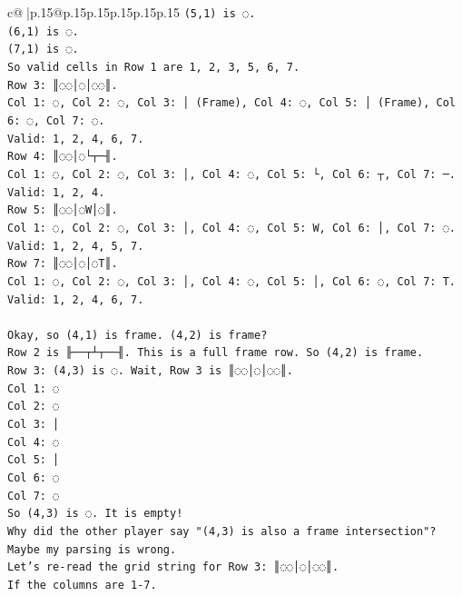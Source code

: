 \documentclass{article}
\begin{document}
{\begin{supertabular}{c@{$\;$}|p{.15\linewidth}@{}p{.15\linewidth}p{.15\linewidth}p{.15\linewidth}p{.15\linewidth}p{.15\linewidth}}
{{{\texttt{(5,1) is ◌.} \\
\texttt{(6,1) is ◌.} \\
\texttt{(7,1) is ◌.} \\
\texttt{So valid cells in Row 1 are 1, 2, 3, 5, 6, 7.} \\
\texttt{Row 3: ║◌◌│◌│◌◌║.} \\
\texttt{Col 1: ◌, Col 2: ◌, Col 3: │ (Frame), Col 4: ◌, Col 5: │ (Frame), Col 6: ◌, Col 7: ◌.} \\
\texttt{Valid: 1, 2, 4, 6, 7.} \\
\texttt{Row 4: ║◌◌│◌└┬─╢.} \\
\texttt{Col 1: ◌, Col 2: ◌, Col 3: │, Col 4: ◌, Col 5: └, Col 6: ┬, Col 7: ─.} \\
\texttt{Valid: 1, 2, 4.} \\
\texttt{Row 5: ║◌◌│◌W│◌║.} \\
\texttt{Col 1: ◌, Col 2: ◌, Col 3: │, Col 4: ◌, Col 5: W, Col 6: │, Col 7: ◌.} \\
\texttt{Valid: 1, 2, 4, 5, 7.} \\
\texttt{Row 7: ║◌◌│◌│◌T║.} \\
\texttt{Col 1: ◌, Col 2: ◌, Col 3: │, Col 4: ◌, Col 5: │, Col 6: ◌, Col 7: T.} \\
\texttt{Valid: 1, 2, 4, 6, 7.} \\
\\ 
\texttt{Okay, so (4,1) is frame. (4,2) is frame?} \\
\texttt{Row 2 is ╟──┬┴┬──╢. This is a full frame row. So (4,2) is frame.} \\
\texttt{Row 3: (4,3) is ◌. Wait, Row 3 is ║◌◌│◌│◌◌║.} \\
\texttt{Col 1: ◌} \\
\texttt{Col 2: ◌} \\
\texttt{Col 3: │} \\
\texttt{Col 4: ◌} \\
\texttt{Col 5: │} \\
\texttt{Col 6: ◌} \\
\texttt{Col 7: ◌} \\
\texttt{So (4,3) is ◌. It is empty!} \\
\texttt{Why did the other player say "(4,3) is also a frame intersection"?} \\
\texttt{Maybe my parsing is wrong.} \\
\texttt{Let's re{-}read the grid string for Row 3: ║◌◌│◌│◌◌║.} \\
\texttt{If the columns are 1{-}7.} \\
}}}
\end{supertabular}}
\end{document}

